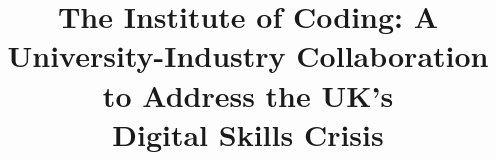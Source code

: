 \documentclass[conference]{IEEEtran}
\begin{document}
\title{The Institute of Coding: A University-Industry Collaboration to
  Address the UK's\\Digital Skills Crisis}





 
\maketitle
\end{document}
